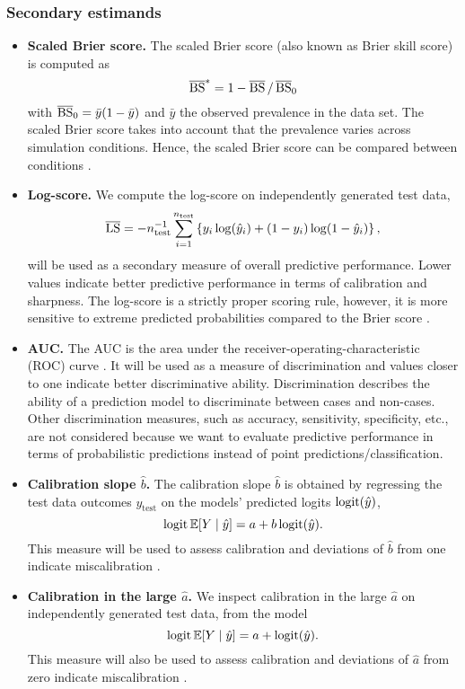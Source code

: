 \subsubsection{Secondary estimands}
\begin{itemize}
  \item \textbf{Scaled Brier score.} The scaled Brier score (also known as Brier
        skill score) is computed as
  $$\operatorname{\overline{BS}}^{*} = 1 - \operatorname{\overline{BS}}/\operatorname{\overline{BS}}_{0}$$
        with $\operatorname{\overline{BS}}_{0} = \bar{y}(1 - \bar{y})$ and $\bar{y}$ the observed
        prevalence in the data set. The scaled Brier score takes into account
        that the prevalence varies across simulation conditions. Hence, the
        scaled Brier score can be compared between conditions \citep{Schmid2005,
        steyerberg2019clinical}.

  \item \textbf{Log-score.} We compute the log-score on independently generated test data,
  $$\operatorname{\overline{LS}} = - n_{\text{test}}^{-1} \sum_{i=1}^{n_{\text{test}}} \left\{ y_{i} \log(\hat{y}_{i})
        + (1 - y_{i}) \log (1 - \hat{y}_{i})\right\},$$ will be used as a
        secondary measure of overall predictive performance. Lower values
        indicate better predictive performance in terms of calibration and
        sharpness. The log-score is a strictly proper scoring rule, however, it
        is more sensitive to extreme predicted probabilities compared to the
        Brier score \citep{Gneiting2007}.
  
  \item \textbf{AUC.} The AUC is the area under the
        receiver-operating-characteristic (ROC) curve
        \citep{steyerberg2019clinical}. It will be used as a measure of
        discrimination and values closer to one indicate better discriminative
        ability. Discrimination describes the ability of a prediction model to
        discriminate between cases and non-cases. Other discrimination measures,
        such as accuracy, sensitivity, specificity, etc., are not considered
        because we want to evaluate predictive performance in terms of
        probabilistic predictions instead of point predictions/classification.

  \item \textbf{Calibration slope $\hat b$.} The calibration slope $\hat b$ is
        obtained by regressing the test data outcomes $y_{\text{test}}$ on the
        models' predicted logits $\operatorname{logit}({\hat{y}})$, \ie
  $$\operatorname{logit}\mathbb{E}[Y \mid \hat{y}] = a + b\operatorname{logit}(\hat{y}).$$
        This measure will be used to assess calibration and deviations of
        $\hat b$ from one indicate miscalibration
        \citep{steyerberg2019clinical}.

  \item \textbf{Calibration in the large $\hat a$.} We inspect calibration in
        the large $\hat a$ on independently generated test data, from the model
  $$\operatorname{logit}\mathbb{E}[Y \mid \hat{y}] = a + \operatorname{logit}(\hat{y}).$$
        This measure will also be used to assess calibration and deviations of
        $\hat a$ from zero indicate miscalibration
        \citep{steyerberg2019clinical}.
\end{itemize}

